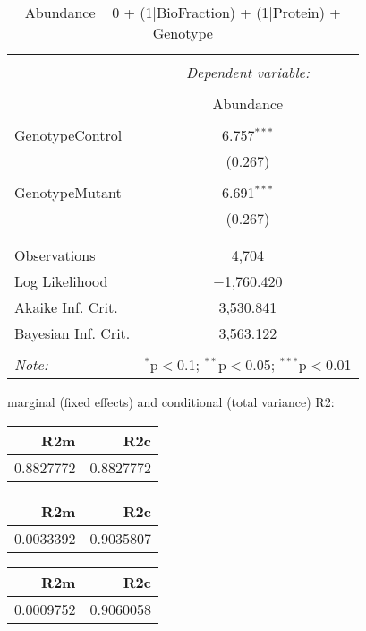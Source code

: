 \documentclass[11pt]{report}
\begin{document}
\begin{table}[!htbp] \centering 
  \caption{Abundance ~ 0 + (1|BioFraction) + (1|Protein) + Genotype} 
  \label{} 
\begin{tabular}{@{\extracolsep{5pt}}lc} 
\\[-1.8ex]\hline 
\hline \\[-1.8ex] 
 & \multicolumn{1}{c}{\textit{Dependent variable:}} \\ 
\cline{2-2} 
\\[-1.8ex] & Abundance \\ 
\hline \\[-1.8ex] 
 GenotypeControl & 6.757$^{***}$ \\ 
  & (0.267) \\ 
  & \\ 
 GenotypeMutant & 6.691$^{***}$ \\ 
  & (0.267) \\ 
  & \\ 
\hline \\[-1.8ex] 
Observations & 4,704 \\ 
Log Likelihood & $-$1,760.420 \\ 
Akaike Inf. Crit. & 3,530.841 \\ 
Bayesian Inf. Crit. & 3,563.122 \\ 
\hline 
\hline \\[-1.8ex] 
\textit{Note:}  & \multicolumn{1}{r}{$^{*}$p$<$0.1; $^{**}$p$<$0.05; $^{***}$p$<$0.01} \\ 
\end{tabular} 
\end{table} 
marginal (fixed effects) and conditional (total variance) R2:

\begin{tabular}{r|r}
\hline
R2m & R2c\\
\hline
0.8827772 & 0.8827772\\
\hline
\end{tabular}

\begin{tabular}{r|r}
\hline
R2m & R2c\\
\hline
0.0033392 & 0.9035807\\
\hline
\end{tabular}

\begin{tabular}{r|r}
\hline
R2m & R2c\\
\hline
0.0009752 & 0.9060058\\
\hline
\end{tabular}
\end{document}
